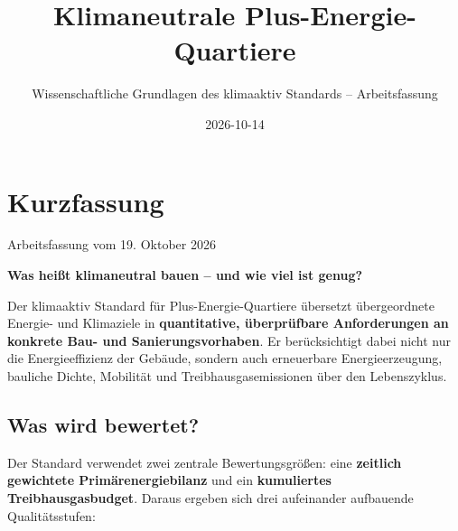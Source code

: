 \documentclass[
  ngerman,
  a4paper,
  DIV=11]{scrreprt}
\title{Klimaneutrale Plus-Energie-Quartiere}
\subtitle{Wissenschaftliche Grundlagen des klimaaktiv Standards --
Arbeitsfassung}
\author{}
\date{2026-10-14}
\renewcommand*\contentsname{Inhaltsverzeichnis}
\newcommand\contentsname{Inhaltsverzeichnis}
\begin{document}
\maketitle

\renewcommand*\contentsname{Inhaltsverzeichnis}
{
\setcounter{tocdepth}{2}
\tableofcontents
}


\chapter*{Kurzfassung}\label{kurzfassung}


\begin{tcolorbox}[enhanced jigsaw, arc=.35mm, bottomrule=.15mm, breakable, colback=white, colframe=quarto-callout-note-color-frame, left=2mm, leftrule=.75mm, opacityback=0, rightrule=.15mm, toprule=.15mm]
\begin{minipage}[t]{5.5mm}
\textcolor{quarto-callout-note-color}{\faInfo}
\end{minipage}%
\begin{minipage}[t]{\textwidth - 5.5mm}

Arbeitsfassung vom 19. Oktober 2026

\end{minipage}%
\end{tcolorbox}

\textbf{Was heißt klimaneutral bauen -- und wie viel ist genug?}

Der klimaaktiv Standard für Plus-Energie-Quartiere übersetzt
übergeordnete Energie- und Klimaziele in \textbf{quantitative,
überprüfbare Anforderungen an konkrete Bau- und Sanierungsvorhaben}. Er
berücksichtigt dabei nicht nur die Energieeffizienz der Gebäude, sondern
auch erneuerbare Energieerzeugung, bauliche Dichte, Mobilität und
Treibhausgasemissionen über den Lebenszyklus.

\section*{Was wird bewertet?}\label{was-wird-bewertet}


Der Standard verwendet zwei zentrale Bewertungsgrößen: eine
\textbf{zeitlich gewichtete Primärenergiebilanz} und ein
\textbf{kumuliertes Treibhausgasbudget}. Daraus ergeben sich drei
aufeinander aufbauende Qualitätsstufen:
\end{document}
